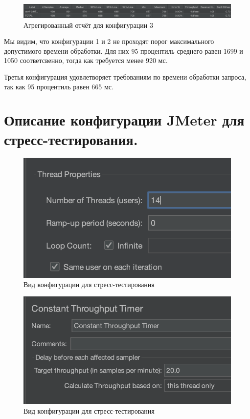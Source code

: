 \documentclass[12pt,onecolumn]{article}
\begin{document}
\begin{figure}[H]
  \includegraphics[width=\textwidth]{image/aggregate-report-conf3.png}
  \caption{Агрегированный отчёт для конфигурации 3}
\end{figure}



Мы видим, что конфигурации 1 и 2 не проходят порог максимального допустимого времени обработки.
Для них 95 процентиль среднего равен 1699 и 1050 соответсвенно, тогда как требуется менее 920 мс.

Третья конфигурация удовлетворяет требованиям по времени обработки запроса, так как 95 процентиль равен 665 мс.

\section*{Описание конфигурации JMeter для стресс-тестирования.}
\begin{figure}[H]
  \includegraphics[width=\textwidth]{image/conf-stress.png}
  \caption{Вид конфигурации для стресс-тестирования}
\end{figure}
\begin{figure}[H]
  \includegraphics[width=\textwidth]{image/throughput-timer-stress.png}
  \caption{Вид конфигурации для стресс-тестирования}
\end{figure}
\end{document}
